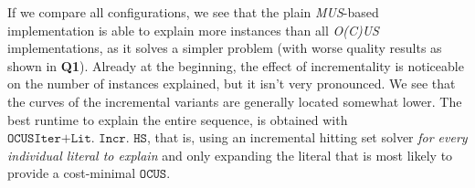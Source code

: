 \documentclass[a4paper,UKenglish,cleveref, autoref, thm-restate, pdfa]{lipics-v2021}
\renewcommand\comment[1]{}
\newcommand{\tias}[1]{{\comment{\color{blue}Tias:#1}}}
\newcommand{\emilio}[1]{{\comment{\color{red}Emilio: #1}}}
\newcommand\mm[1]{\ensuremath{#1}\xspace}
\newcommand\call[1]{\mm{\texttt{#1}}}
\newcommand\comus{\mm{\call{OCUS}}}
\newcommand\ousbiterincr{\mm{\call{OCUSIter+Lit.~Incr.~HS}}}
\begin{document}
	
	\emilio{is the time to explain linked to the "difficulty" of the instance, i.e. sum of the explanation costs/ $\#$ of explanations ?}
	If we compare all configurations, we see that the plain \emph{MUS}-based implementation is able to explain more instances than all \emph{O(C)US} implementations, as it solves a simpler problem (with worse quality results as shown in \textbf{Q1}).%
		Already at the beginning, the effect of incrementality is noticeable on the number of instances explained, but it isn't very pronounced. 
		We see that the curves of the incremental variants are generally located somewhat lower. 
		The best runtime to explain the entire sequence, is obtained with \ousbiterincr, that is, using an incremental hitting set solver \emph{for every individual literal to explain} and only expanding the literal that is most likely to provide a cost-minimal \comus.
		
\end{document}
